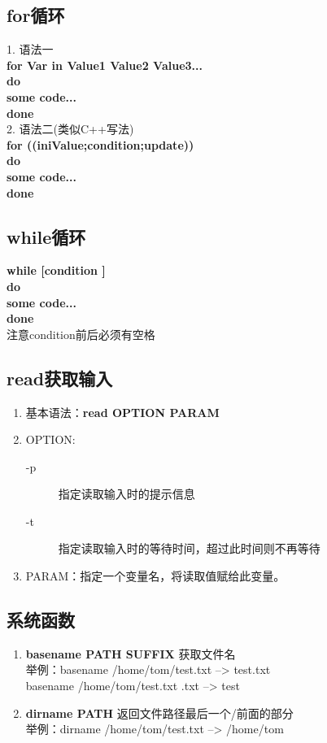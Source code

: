 \documentclass[11pt]{article}
\begin{document}
\subsection{for循环}
1. 语法一 \\
\textbf{
    for Var in Value1 Value2 Value3... \\
    do \\
    some code... \\
    done
} \\
2. 语法二(类似C++写法) \\
\textbf{
    for ((iniValue;condition;update)) \\
    do \\
    some code... \\
    done
}

\subsection{while循环}
\textbf{
    while [\quad condition \quad] \\
    do \\
    some code... \\
    done
} \\
注意condition前后必须有空格

\subsection{read获取输入}
\begin{enumerate}
    \item 基本语法：\textbf{read OPTION PARAM}
    \item OPTION:
    \begin{description}
        \item[-p] 指定读取输入时的提示信息
        \item[-t] 指定读取输入时的等待时间，超过此时间则不再等待
    \end{description}
    \item PARAM：指定一个变量名，将读取值赋给此变量。
\end{enumerate}

\subsection{系统函数}
\begin{enumerate}
    \item \textbf{basename PATH SUFFIX} 获取文件名 \\
    举例：basename /home/tom/test.txt \quad --> \quad test.txt  \\
    basename /home/tom/test.txt .txt \quad --> \quad test
    \item \textbf{dirname PATH} 返回文件路径最后一个/前面的部分 \\
    举例：dirname /home/tom/test.txt \quad --> \quad /home/tom
\end{enumerate}
\end{document}
